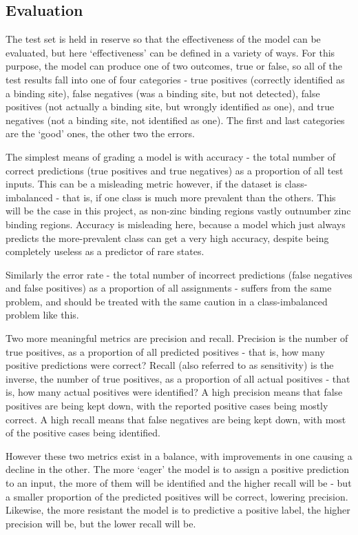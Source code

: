 \subsection{Evaluation}

The test set is held in reserve so that the effectiveness of the model can be evaluated, but here `effectiveness' can be defined in a variety of ways. For this purpose, the model can produce one of two outcomes, true or false, so all of the test results fall into one of four categories - true positives (correctly identified as a binding site), false negatives (was a binding site, but not detected), false positives (not actually a binding site, but wrongly identified as one), and true negatives (not a binding site, not identified as one). The first and last categories are the `good' ones, the other two the errors.

The simplest means of grading a model is with accuracy - the total number of correct predictions (true positives and true negatives) as a proportion of all test inputs. This can be a misleading metric however, if the dataset is class-imbalanced - that is, if one class is much more prevalent than the others. This will be the case in this project, as non-zinc binding regions vastly outnumber zinc binding regions. Accuracy is misleading here, because a model which just always predicts the more-prevalent class can get a very high accuracy, despite being completely useless as a predictor of rare states.

Similarly the error rate - the total number of incorrect predictions (false negatives and false positives) as a proportion of all assignments - suffers from the same problem, and should be treated with the same caution in a class-imbalanced problem like this.

Two more meaningful metrics are precision and recall. Precision is the number of true positives, as a proportion of all predicted positives - that is, how many positive predictions were correct? Recall (also referred to as sensitivity) is the inverse, the number of true positives, as a proportion of all actual positives - that is, how many actual positives were identified? A high precision means that false positives are being kept down, with the reported positive cases being mostly correct. A high recall means that false negatives are being kept down, with most of the positive cases being identified.

However these two metrics exist in a balance, with improvements in one causing a decline in the other. The more `eager' the model is to assign a positive prediction to an input, the more of them will be identified and the higher recall will be - but a smaller proportion of the predicted positives will be correct, lowering precision. Likewise, the more resistant the model is to predictive a positive label, the higher precision will be, but the lower recall will be.

